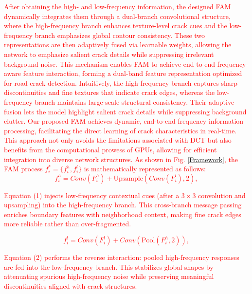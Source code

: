 \documentclass[lettersize,journal,onecolumn,12pt]{IEEEtran}
\begin{document}
\textcolor{red}{After obtaining the high- and low-frequency information, the designed FAM dynamically integrates them through a dual-branch convolutional structure, where the high-frequency branch enhances texture-level crack cues and the low-frequency branch emphasizes global contour consistency. 
These two representations are then adaptively fused via learnable weights, allowing the network to emphasize salient crack details while suppressing irrelevant background noise. 
This mechanism enables FAM to achieve end-to-end frequency-aware feature interaction, forming a dual-band feature representation optimized for road crack detection.}
\textcolor{red}{Intuitively, the high-frequency branch captures sharp discontinuities and fine textures that indicate crack edges, whereas the low-frequency branch maintains large-scale structural consistency. Their adaptive fusion lets the model highlight salient crack details while suppressing background clutter.
 Our proposed FAM achieves dynamic, end-to-end frequency information processing, facilitating the direct learning of crack characteristics in real-time. This approach not only avoids the limitations associated with DCT but also benefits from the computational prowess of GPUs, allowing for efficient integration into diverse network structures. As shown in Fig. \ref{Framework}, the FAM process $f^*_{i} = \{f^{h}_{i},f^{l}_{i}\}$ is mathematically represented as follows:}\\ [5pt]

\textcolor{red}{
\begin{equation}
f^{h}_{i} = Conv(F^{h}_{i}) + \text{Upsample}(Conv(F^{l}_{i}), 2),
\end{equation}
}


\textcolor{red}{Equation (1) injects low-frequency contextual cues (after a $3\times3$ convolution and upsampling) into the high-frequency branch. This cross-branch message passing enriches boundary features with neighborhood context, making fine crack edges more reliable rather than over-fragmented.}

\textcolor{red}{
\begin{equation}
f^{l}_{i} = Conv(F^{l}_{i}) + Conv(\text{Pool}(F^{h}_{i}, 2)),
\end{equation}
}

\textcolor{red}{Equation (2) performs the reverse interaction: pooled high-frequency responses are fed into the low-frequency branch. This stabilizes global shapes by attenuating spurious high-frequency noise while preserving meaningful discontinuities aligned with crack structures.}
\end{document}

